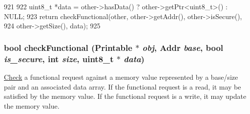 \begin{DoxyCode}
921     {
922         uint8_t *data = other->hasData() ? other->getPtr<uint8_t>() : NULL;
923         return checkFunctional(other, other->getAddr(), other->isSecure(),
924                                other->getSize(), data);
925     }
\end{DoxyCode}
\hypertarget{classPacket_a77410f93ce8057ce67882c121ac2e667}{
\subsubsection[{checkFunctional}]{\setlength{\rightskip}{0pt plus 5cm}bool checkFunctional ({\bf Printable} $\ast$ {\em obj}, \/  {\bf Addr} {\em base}, \/  bool {\em is\_\-secure}, \/  int {\em size}, \/  uint8\_\-t $\ast$ {\em data})}}
\label{classPacket_a77410f93ce8057ce67882c121ac2e667}
\hyperlink{classCheck}{Check} a functional request against a memory value represented by a base/size pair and an associated data array. If the functional request is a read, it may be satisfied by the memory value. If the functional request is a write, it may update the memory value. 


